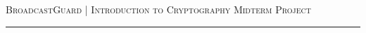 \documentclass[11pt,a4paper]{article}
\begin{document}

\pagestyle{plain}

\begin{center}
{\small\textsc{BroadcastGuard \quad | \quad Introduction to Cryptography Midterm Project}}\par
\vspace{0.3em}\hrule
\end{center}








{}
\small


\end{document}
